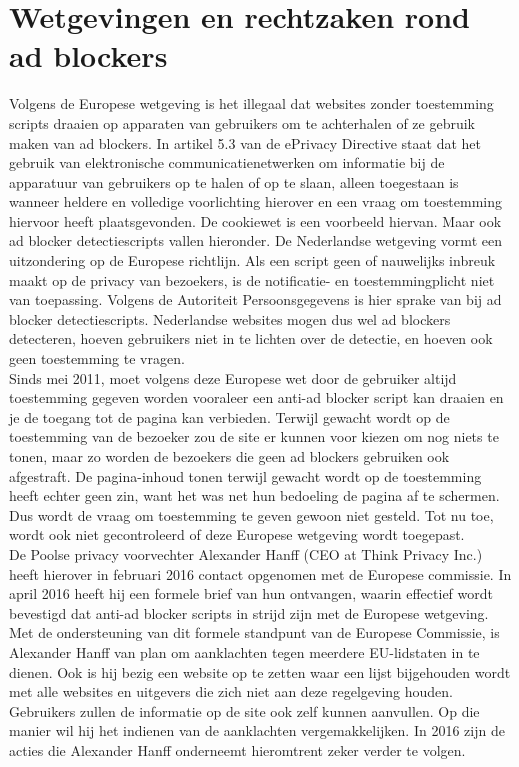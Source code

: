 \documentclass[pdftex,a4paper,12pt,twoside]{report}
\begin{document}
\section{Wetgevingen en rechtzaken rond ad blockers}
\label{sec:Wetgevingen en rechtzaken rond ad blockers}
Volgens de Europese wetgeving is het illegaal dat websites zonder toestemming scripts draaien op apparaten van gebruikers om te achterhalen of ze gebruik maken van ad blockers. 
In artikel 5.3 van de ePrivacy Directive staat dat het gebruik van elektronische communicatienetwerken om informatie bij de apparatuur van gebruikers op te halen of op te slaan, alleen toegestaan is wanneer heldere en volledige voorlichting hierover en een vraag om toestemming hiervoor heeft plaatsgevonden. 
De cookiewet is een voorbeeld hiervan. Maar ook ad blocker detectiescripts vallen hieronder. De Nederlandse wetgeving vormt een uitzondering op de Europese richtlijn. Als een script geen of nauwelijks inbreuk maakt op de privacy van bezoekers, is de notificatie- en toestemmingplicht niet van toepassing. Volgens de Autoriteit Persoonsgegevens is hier sprake van bij ad blocker detectiescripts. Nederlandse websites mogen dus wel ad blockers detecteren, hoeven gebruikers niet in te lichten over de detectie, en hoeven ook geen toestemming te vragen. 
\\
Sinds mei 2011, moet volgens deze Europese wet door de gebruiker altijd toestemming gegeven worden vooraleer een anti-ad blocker script kan draaien en je de toegang tot de pagina kan verbieden. Terwijl gewacht wordt op de toestemming van de bezoeker zou de site er kunnen voor kiezen om nog niets te tonen, maar zo worden de bezoekers die geen ad blockers gebruiken ook afgestraft. De pagina-inhoud tonen terwijl gewacht wordt op de toestemming heeft echter geen zin, want het was net hun bedoeling de pagina af te schermen. Dus wordt de vraag om toestemming te geven gewoon niet gesteld. Tot nu toe, wordt ook niet gecontroleerd of deze Europese wetgeving wordt toegepast.
\\
De Poolse privacy voorvechter Alexander Hanff (CEO at Think Privacy Inc.) heeft hierover in februari 2016 contact opgenomen met de Europese commissie. In april 2016 heeft hij een formele brief van hun ontvangen, waarin effectief wordt bevestigd dat anti-ad blocker scripts in strijd zijn met de Europese wetgeving. 
Met de ondersteuning van dit formele standpunt van de Europese Commissie, is Alexander Hanff van plan om aanklachten tegen meerdere EU-lidstaten in te dienen. Ook is hij bezig een website op te zetten waar een lijst bijgehouden wordt met alle websites en uitgevers die zich niet aan deze regelgeving houden. Gebruikers zullen de informatie op de site ook zelf kunnen aanvullen. Op die manier wil hij het indienen van de aanklachten vergemakkelijken.
In 2016 zijn de acties die Alexander Hanff onderneemt hieromtrent zeker verder te volgen.
\end{document}
